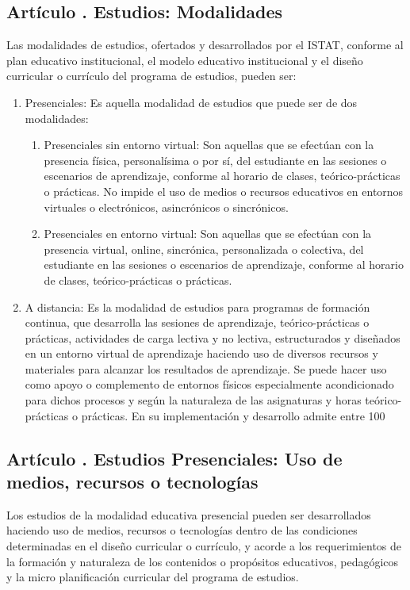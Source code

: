 \subsection{Artículo . Estudios: Modalidades}
\addtocounter{ns}{1}
Las modalidades de estudios, ofertados y desarrollados por el ISTAT, conforme al plan educativo institucional, el modelo educativo institucional y el diseño curricular o currículo del programa de estudios, pueden ser: 
\begin{enumerate}
\item Presenciales: Es aquella modalidad de estudios que puede ser de dos modalidades: 
	\begin{enumerate}
		\item Presenciales sin entorno virtual: Son aquellas que se efectúan con la presencia física, personalísima o por sí, del estudiante en las sesiones o escenarios de aprendizaje, conforme al horario de clases, teórico-prácticas o prácticas. No impide el uso de medios o recursos educativos en entornos virtuales o electrónicos, asincrónicos o sincrónicos. 
		\item Presenciales en entorno virtual: Son aquellas que se efectúan con la presencia virtual, online, sincrónica, personalizada o colectiva, del estudiante en las sesiones o escenarios de aprendizaje, conforme al horario de clases, teórico-prácticas o prácticas.  
	\end{enumerate}
\item A distancia: Es la modalidad de estudios para programas de formación continua, que desarrolla las sesiones de aprendizaje, teórico-prácticas o prácticas, actividades de carga lectiva y no lectiva, estructurados y diseñados en un entorno virtual de aprendizaje haciendo uso de diversos recursos y materiales para alcanzar los resultados de aprendizaje. Se puede hacer uso como apoyo o complemento de entornos físicos especialmente acondicionado para dichos procesos y según la naturaleza de las asignaturas y horas teórico-prácticas o prácticas. En su implementación y desarrollo admite entre 100%
\end{enumerate}
\subsection{Artículo . Estudios Presenciales: Uso de medios, recursos o tecnologías}
\addtocounter{ns}{1}
Los estudios de la modalidad educativa presencial pueden ser desarrollados haciendo uso de medios, recursos o tecnologías dentro de las condiciones determinadas en el diseño curricular o currículo, y acorde a los requerimientos de la formación y naturaleza de los contenidos o propósitos educativos, pedagógicos y la micro planificación curricular del programa de estudios. 
